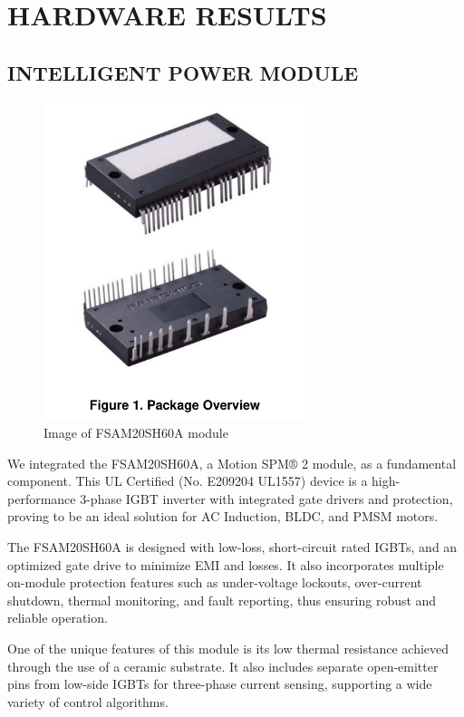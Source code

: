 \section{HARDWARE RESULTS}

\subsection{INTELLIGENT POWER MODULE}

\begin{figure}[H]
	\centering
	\includegraphics[width=3in]{sections/section4/images/IPM/ipm.png}
	\caption{Image of FSAM20SH60A module}
\end{figure}


We integrated the FSAM20SH60A, a Motion SPM® 2 module, as a fundamental component. This UL Certified (No. E209204 UL1557) device is a high-performance 3-phase IGBT inverter with integrated gate drivers and protection, proving to be an ideal solution for AC Induction, BLDC, and PMSM motors.

The FSAM20SH60A is designed with low-loss, short-circuit rated IGBTs, and an optimized gate drive to minimize EMI and losses. It also incorporates multiple on-module protection features such as under-voltage lockouts, over-current shutdown, thermal monitoring, and fault reporting, thus ensuring robust and reliable operation. 

One of the unique features of this module is its low thermal resistance achieved through the use of a ceramic substrate. It also includes separate open-emitter pins from low-side IGBTs for three-phase current sensing, supporting a wide variety of control algorithms. 

